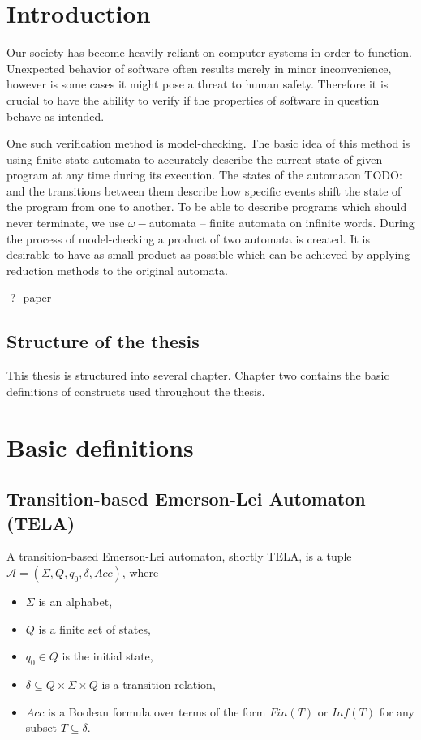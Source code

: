 \documentclass[
  digital, %
  twoside, %
  table,   %
  lof,     %
  lot,     %
]{fithesis3}
\begin{document}
\chapter{Introduction}

Our society has become heavily reliant on computer systems in order to function. Unexpected behavior of software often results merely in minor inconvenience, however is some cases it might pose a threat to human safety. Therefore it is crucial to have the ability to verify if the properties of software in question behave as intended. 

One such verification method is model-checking. The basic idea of this method is using finite state automata to accurately describe the current state of given program at any time during its execution. The states of the automaton TODO: and the transitions between them describe how specific events shift the state of the program from one to another. To be able to describe programs which should never terminate, we use $\omega-$automata -- finite automata on infinite words. During the process of model-checking a product of two automata is created. It is desirable to have as small product as possible which can be achieved by applying reduction methods to the original automata. 

-?- paper

\section{Structure of the thesis}
This thesis is structured into several chapter. Chapter two contains the basic definitions of constructs used throughout the thesis. %

\chapter{Basic definitions}
\section{Transition-based Emerson-Lei Automaton (TELA)} %
A transition-based Emerson-Lei automaton, shortly TELA, is a tuple $\mathcal{A} = (\Sigma, Q, q_0, \delta, Acc)$, where
\begin{itemize}
  \item $\Sigma$ is an alphabet,
  \item $Q$ is a finite set of states,
  \item $q_0 \in Q$ is the initial state,
  \item $\delta \subseteq Q \times \Sigma \times Q$ is a transition relation,
  \item $Acc$ is a Boolean formula over terms of the form $Fin(T)$ or $Inf(T)$ for any subset $T \subseteq \delta$. %
\end{itemize}
\end{document}
